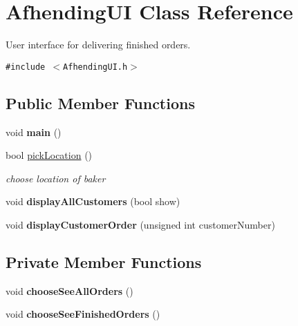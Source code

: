 \hypertarget{class_afhending_u_i}{
\section{Afhending\-UI Class Reference}
\label{class_afhending_u_i}
}
User interface for delivering finished orders.  


{\tt \#include $<$Afhending\-UI.h$>$}

\subsection*{Public Member Functions}
\begin{CompactItemize}
\item 
\hypertarget{class_afhending_u_i_ea83b916b3f52eec32ae6d54d59b4453}{
void {\bf main} ()}
\label{class_afhending_u_i_ea83b916b3f52eec32ae6d54d59b4453}

\item 
bool \hyperlink{class_afhending_u_i_74d0d6b7d7493e8a9703bc8fbeb79f2e}{pick\-Location} ()
\begin{CompactList}\small\item\em choose location of baker \item\end{CompactList}\item 
\hypertarget{class_afhending_u_i_388ec3e6c0999970759fa9fdcacda10e}{
void {\bf display\-All\-Customers} (bool show)}
\label{class_afhending_u_i_388ec3e6c0999970759fa9fdcacda10e}

\item 
\hypertarget{class_afhending_u_i_537283a7f7677384872f66c6b1dc4491}{
void {\bf display\-Customer\-Order} (unsigned int customer\-Number)}
\label{class_afhending_u_i_537283a7f7677384872f66c6b1dc4491}

\end{CompactItemize}
\subsection*{Private Member Functions}
\begin{CompactItemize}
\item 
\hypertarget{class_afhending_u_i_d7bd9a6e8c49c52704a9ab4e7c5a1a4c}{
void {\bf choose\-See\-All\-Orders} ()}
\label{class_afhending_u_i_d7bd9a6e8c49c52704a9ab4e7c5a1a4c}

\item 
\hypertarget{class_afhending_u_i_15b0d1b4f26c36d7ff8bc459a31dd192}{
void {\bf choose\-See\-Finished\-Orders} ()}
\label{class_afhending_u_i_15b0d1b4f26c36d7ff8bc459a31dd192}

\end{CompactItemize}
